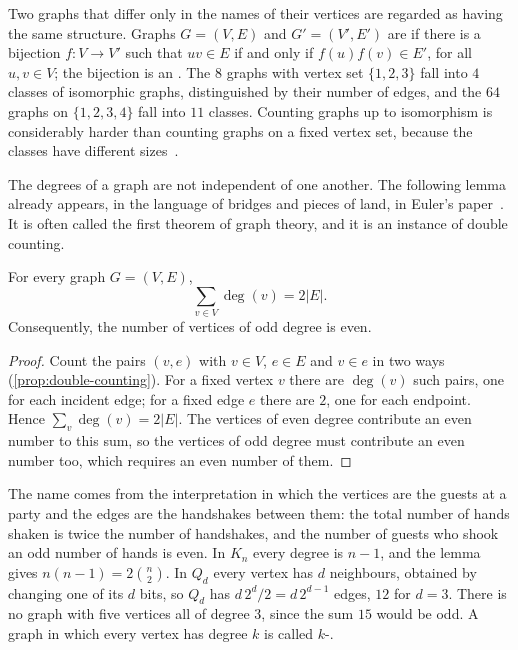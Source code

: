 Two graphs that differ only in the names of their vertices are regarded as having the same structure. Graphs $G=(V,E)$ and $G'=(V',E')$ are  if there is a bijection $f\colon V\to V'$ such that $uv\in E$ if and only if $f(u)f(v)\in E'$, for all $u,v\in V$; the bijection is an . The $8$ graphs with vertex set $\{1,2,3\}$ fall into $4$ classes of isomorphic graphs, distinguished by their number of edges, and the $64$ graphs on $\{1,2,3,4\}$ fall into $11$ classes. Counting graphs up to isomorphism is considerably harder than counting graphs on a fixed vertex set, because the classes have different sizes~\cite{harary1973enumeration}.

The degrees of a graph are not independent of one another. The following lemma already appears, in the language of bridges and pieces of land, in Euler's paper~\cite{euler1741konigsberg,biggs1976}. It is often called the first theorem of graph theory, and it is an instance of double counting.

\begin{lemma}
\label{lem:handshake}
For every graph $G=(V,E)$,
\[
\sum_{v\in V}\deg(v)=2|E| .
\]
Consequently, the number of vertices of odd degree is even.
\end{lemma}

\begin{proof}
Count the pairs $(v,e)$ with $v\in V$, $e\in E$ and $v\in e$ in two ways (\cref{prop:double-counting}). For a fixed vertex $v$ there are $\deg(v)$ such pairs, one for each incident edge; for a fixed edge $e$ there are $2$, one for each endpoint. Hence $\sum_v\deg(v)=2|E|$. The vertices of even degree contribute an even number to this sum, so the vertices of odd degree must contribute an even number too, which requires an even number of them.
\end{proof}

The name comes from the interpretation in which the vertices are the guests at a party and the edges are the handshakes between them: the total number of hands shaken is twice the number of handshakes, and the number of guests who shook an odd number of hands is even. In $K_n$ every degree is $n-1$, and the lemma gives $n(n-1)=2\binom n2$. In $Q_d$ every vertex has $d$ neighbours, obtained by changing one of its $d$ bits, so $Q_d$ has $d\,2^d/2=d\,2^{d-1}$ edges, $12$ for $d=3$. There is no graph with five vertices all of degree $3$, since the sum $15$ would be odd. A graph in which every vertex has degree $k$ is called $k$-.

